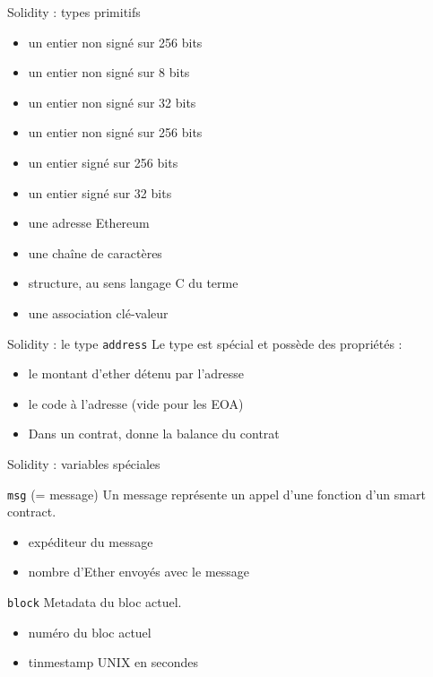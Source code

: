 \begin{frame}{Solidity : types primitifs}
  \begin{itemize}
    \item {} un entier non signé sur 256 bits
    \item {} un entier non signé sur 8 bits
    \item {} un entier non signé sur 32 bits
    \item {} un entier non signé sur 256 bits
    \item {} un entier signé sur 256 bits
    \item {} un entier signé sur 32 bits
    \item {} une adresse Ethereum
    \item {} une chaîne de caractères
    \item {} structure, au sens langage C du terme
    \item {} une association clé-valeur
  \end{itemize}
\end{frame}

\begin{frame}[fragile]{Solidity : le type \texttt{address}}
  Le type  est spécial et possède des propriétés :

  \begin{itemize}
    \item {} le montant d'ether détenu par l'adresse
    \item {} le code à l'adresse (vide pour les EOA)
    \item Dans un contrat,  donne la balance du contrat
  \end{itemize}
\end{frame}

\begin{frame}{Solidity : variables spéciales}
  \begin{block}{\texttt{msg} (= message)}
    Un message représente un appel d'une fonction d'un smart contract.

    \begin{itemize}
      \item {} expéditeur du message
      \item {} nombre d'Ether envoyés avec le message
    \end{itemize}
  \end{block}


  \begin{block}{\texttt{block}}
    Metadata du bloc actuel.

    \begin{itemize}
      \item {} numéro du bloc actuel
      \item {} tinmestamp UNIX en secondes
    \end{itemize}
  \end{block}
\end{frame}

